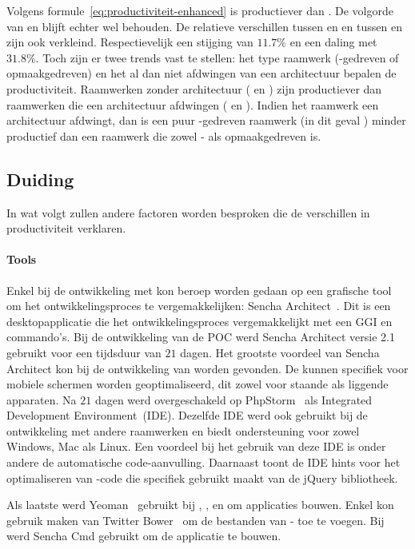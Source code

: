 Volgens formule~\ref{eq:productiviteit-enhanced} is \jqm{} productiever dan \lungo{}. 
De volgorde van \kendo{} en \st{} blijft echter wel behouden.
De relatieve verschillen tussen \jqm{} en \lungo{} en tussen \st{} en \kendo{} zijn ook verkleind.  
Respectievelijk een stijging van $11.7\%$ en een daling met $31.8\%$.
Toch zijn er twee trends vast te stellen: het type raamwerk (\js-gedreven of opmaakgedreven) en het al dan niet afdwingen van een architectuur bepalen de productiviteit.
Raamwerken zonder architectuur (\jqm{} en \lungo{}) zijn productiever dan raamwerken die een architectuur afdwingen (\st{} en \kendo{}).
Indien het raamwerk een architectuur afdwingt, dan is een puur \js{}-gedreven raamwerk (in dit geval \st{}) minder productief dan een raamwerk die zowel \js{}- als opmaakgedreven is.

\subsection{Duiding}
In wat volgt zullen andere factoren worden besproken die de verschillen in productiviteit verklaren.

\paragraph{Tools}
Enkel bij de ontwikkeling met \st{} kon beroep worden gedaan op een grafische tool om het ontwikkelingsproces te vergemakkelijken:  Sencha Architect~\cite{Sencha2012a}.
Dit is een desktopapplicatie die het ontwikkelingsproces vergemakkelijkt met een GGI en  commando's.  
Bij de ontwikkeling van de POC werd Sencha Architect versie 2.1 gebruikt voor een tijdsduur van $21$ dagen.
Het grootste voordeel van Sencha Architect kon bij de ontwikkeling van  worden gevonden.
De  kunnen specifiek voor mobiele schermen worden geoptimaliseerd, dit zowel voor staande als liggende apparaten.
Na $21$ dagen werd overgeschakeld op PhpStorm~\cite{JetBrains2012} als Integrated Development Environment~(IDE).
Dezelfde IDE werd ook gebruikt bij de ontwikkeling met andere raamwerken en biedt ondersteuning voor zowel Windows, Mac als Linux.
Een voordeel bij het gebruik van deze IDE is onder andere de automatische code-aanvulling.
Daarnaast toont de IDE hints voor het optimaliseren van \js{}-code die specifiek gebruikt maakt van de jQuery bibliotheek.

Als laatste werd Yeoman~\cite{Yeoman2013} gebruikt bij \kendo{}, \jqm{}, en \lungo{} om applicaties bouwen.
Enkel \lungo{} kon gebruik maken van Twitter Bower~\cite{Twitter2013} om de bestanden van \gh{}- toe te voegen.
Bij \st{} werd Sencha Cmd gebruikt om de applicatie te bouwen.

